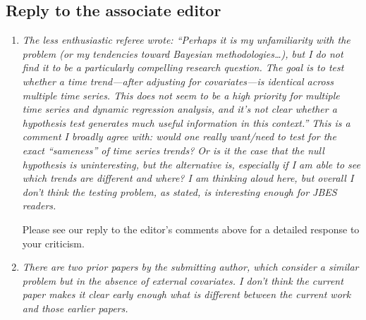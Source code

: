 \documentclass[a4paper,12pt]{article}
\begin{document}
\subsection*{Reply to the associate editor}


\begin{enumerate}[label=\arabic*.,leftmargin=0.6cm]


\item \textit{The less enthusiastic referee wrote: “Perhaps it is my unfamiliarity with the problem (or my tendencies toward Bayesian methodologies…), but I do not find it to be a particularly compelling research question. The goal is to test whether a time trend—after adjusting for covariates—is identical across multiple time series. This does not seem to be a high priority for multiple time series and dynamic regression analysis, and it’s not clear whether a hypothesis test generates much useful information in this context.” This is a comment I broadly agree with: would one really want/need to test for the exact “sameness” of time series trends? Or is it the case that the null hypothesis is uninteresting, but the alternative is, especially if I am able to see which trends are different and where? I am thinking aloud here, but overall I don’t think the testing problem, as stated, is interesting enough for JBES readers.}

Please see our reply to the editor's comments above for a detailed response to your criticism. 
  

\item \textit{There are two prior papers by the submitting author, which consider a similar problem but in the absence of external covariates. I don’t think the current paper makes it clear early enough what is different between the current work and those earlier papers.}  


\end{enumerate}
\end{document}
